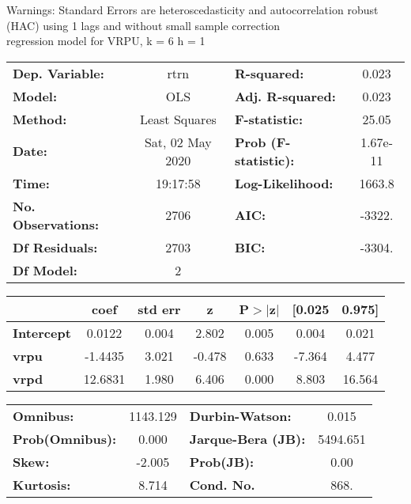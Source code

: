 Warnings: \newline
 [1] Standard Errors are heteroscedasticity and autocorrelation robust (HAC) using 1 lags and without small sample correction\\ 

regression model for VRPU, k = 6 h = 1\begin{center}
\begin{tabular}{lclc}
\toprule
\textbf{Dep. Variable:}    &       rtrn       & \textbf{  R-squared:         } &     0.023   \\
\textbf{Model:}            &       OLS        & \textbf{  Adj. R-squared:    } &     0.023   \\
\textbf{Method:}           &  Least Squares   & \textbf{  F-statistic:       } &     25.05   \\
\textbf{Date:}             & Sat, 02 May 2020 & \textbf{  Prob (F-statistic):} &  1.67e-11   \\
\textbf{Time:}             &     19:17:58     & \textbf{  Log-Likelihood:    } &    1663.8   \\
\textbf{No. Observations:} &        2706      & \textbf{  AIC:               } &    -3322.   \\
\textbf{Df Residuals:}     &        2703      & \textbf{  BIC:               } &    -3304.   \\
\textbf{Df Model:}         &           2      & \textbf{                     } &             \\
\bottomrule
\end{tabular}
\begin{tabular}{lcccccc}
                   & \textbf{coef} & \textbf{std err} & \textbf{z} & \textbf{P$> |$z$|$} & \textbf{[0.025} & \textbf{0.975]}  \\
\midrule
\textbf{Intercept} &       0.0122  &        0.004     &     2.802  &         0.005        &        0.004    &        0.021     \\
\textbf{vrpu}      &      -1.4435  &        3.021     &    -0.478  &         0.633        &       -7.364    &        4.477     \\
\textbf{vrpd}      &      12.6831  &        1.980     &     6.406  &         0.000        &        8.803    &       16.564     \\
\bottomrule
\end{tabular}
\begin{tabular}{lclc}
\textbf{Omnibus:}       & 1143.129 & \textbf{  Durbin-Watson:     } &    0.015  \\
\textbf{Prob(Omnibus):} &   0.000  & \textbf{  Jarque-Bera (JB):  } & 5494.651  \\
\textbf{Skew:}          &  -2.005  & \textbf{  Prob(JB):          } &     0.00  \\
\textbf{Kurtosis:}      &   8.714  & \textbf{  Cond. No.          } &     868.  \\
\bottomrule
\end{tabular}
\end{center}

